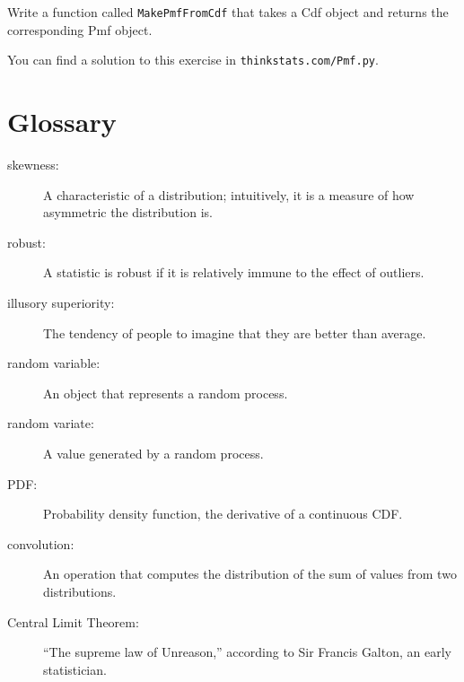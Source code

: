 \documentclass[12pt]{book}
\begin{document}
\begin{exercise}
Write a function called {\tt MakePmfFromCdf} that takes a Cdf object
and returns the corresponding Pmf object.

You can find a solution to this exercise in {\tt thinkstats.com/Pmf.py}.

\end{exercise}

\section{Glossary}

\begin{description}

\item[skewness:] A characteristic of a distribution; intuitively, it
is a measure of how asymmetric the distribution is.

\item[robust:] A statistic is robust if it is relatively immune to the
  effect of outliers.

\item[illusory superiority:] The tendency of people to imagine that
they are better than average.

\item[random variable:] An object that represents a random process.

\item[random variate:] A value generated by a random process.

\item[PDF:] Probability density function, the derivative of a continuous CDF.

\item[convolution:] An operation that computes the distribution of the
sum of values from two distributions. 



\item[Central Limit Theorem:] ``The supreme law of Unreason,'' according
to Sir Francis Galton, an early statistician.

\end{description}
\end{document}
